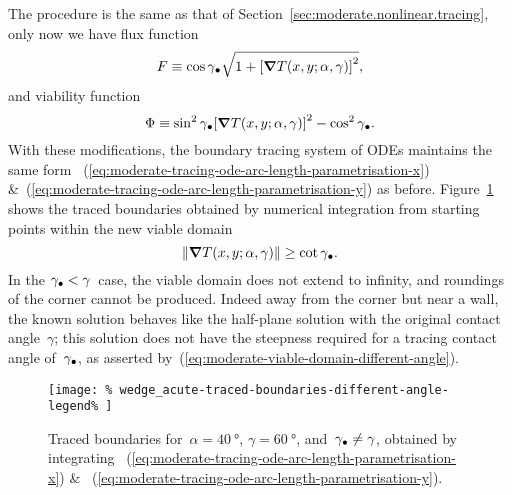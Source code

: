 The procedure is the same
as that of Section~\ref{sec:moderate.nonlinear.tracing},
only now we have flux function
\begin{equation}
  F \ideq
    \cos\gamma_\tr
    \sqrt{1 + \squarebr[\bulkysize]{\del T (x, y; \alpha, \gamma)}^2},
  \label{eq:moderate-flux-function-different-angle}
\end{equation}
and viability function
\begin{equation}
  \Phi \ideq
    \sin^2\gamma_\tr \squarebr[\bulkysize]{\del T (x, y; \alpha, \gamma)}^2
    - \cos^2\gamma_\tr.
    \label{eq:moderate-viability-function-different-angle}
\end{equation}
With these modifications,
the boundary tracing system of ODEs maintains the same form~%
  (\ref{eq:moderate-tracing-ode-arc-length-parametrisation-x})
\&~(\ref{eq:moderate-tracing-ode-arc-length-parametrisation-y})
as before.
Figure~\ref{fig:wedge_acute-traced-boundaries-different-angle}
shows the traced boundaries obtained by numerical integration
from starting points within the new viable domain
\begin{equation}
  \norm[\bulkysize]{\del T (x, y; \alpha, \gamma)} \ge \cot\gamma_\tr.
  \label{eq:moderate-viable-domain-different-angle}
\end{equation}
In the $\gamma_\bullet < \gamma$~case,
the viable domain does not extend to infinity,
and roundings of the corner cannot be produced.
Indeed away from the corner but near a wall,
the known solution behaves like the half-plane solution
with the original contact angle~$\gamma$;
this solution does not have the steepness required
for a tracing contact angle of~$\gamma_\bullet$,
as asserted by~(\ref{eq:moderate-viable-domain-different-angle}).

\begin{figure}
  \newcommand*{\subfigurewidth}{0.45\textwidth}
  \centering
  \texttt{[image: \%
    wedge\_acute-traced-boundaries-different-angle-legend\%
  ]}
  \hspace*{\fill}
  \begin{subfigure}[t]{\subfigurewidth}
  \end{subfigure}
    \hfill
  \begin{subfigure}[t]{\subfigurewidth}
  \end{subfigure}
  \hspace*{\fill}
  \caption{
    Traced boundaries for~$\alpha = \SI{40}{\degree}$,
    $\gamma = \SI{60}{\degree}$, and~$\gamma_\bullet \ne \gamma$,
    obtained by integrating~%
      (\ref{eq:moderate-tracing-ode-arc-length-parametrisation-x})
    \&~%
      (\ref{eq:moderate-tracing-ode-arc-length-parametrisation-y}).
  }
  \label{fig:wedge_acute-traced-boundaries-different-angle}
\end{figure}

